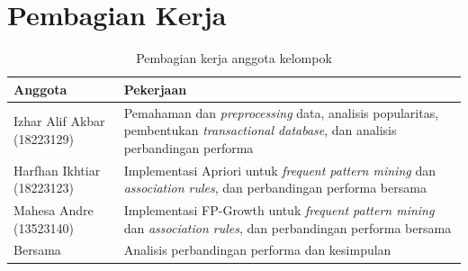 \chapter{Pembagian Kerja}
\label{lamp:pembagian}

\begin{table}[!htb]
\caption{Pembagian kerja anggota kelompok}
\label{tab:pembagian}
\small
\begin{tabularx}{\textwidth}{@{}>{\raggedright\arraybackslash}p{4.2cm}>{\raggedright\arraybackslash}X@{}}
\toprule
\textbf{Anggota} & \textbf{Pekerjaan} \\
\midrule
Izhar Alif Akbar (18223129) & Pemahaman dan \textit{preprocessing} data, analisis popularitas, pembentukan \textit{transactional database}, dan analisis perbandingan performa \\
\midrule
Harfhan Ikhtiar (18223123) & Implementasi Apriori untuk \textit{frequent pattern mining} dan \textit{association rules}, dan perbandingan performa bersama \\
\midrule
Mahesa Andre (13523140) & Implementasi FP-Growth untuk \textit{frequent pattern mining} dan \textit{association rules}, dan perbandingan performa bersama \\
\midrule
Bersama & Analisis perbandingan performa dan kesimpulan \\
\bottomrule
\end{tabularx}
\end{table}
